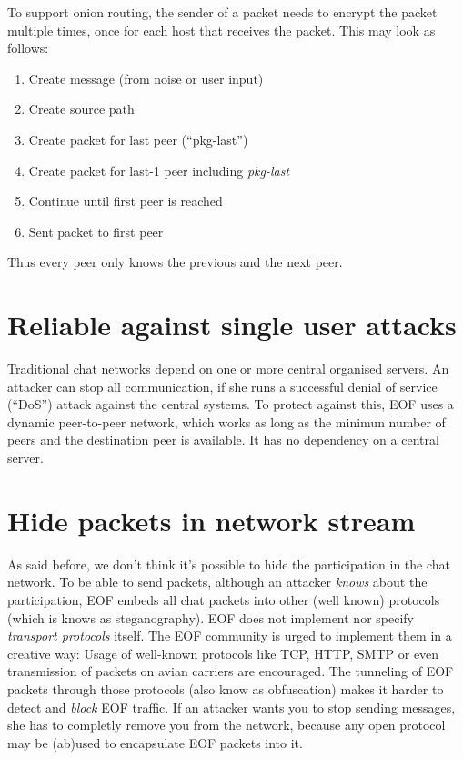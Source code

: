To support onion routing, the sender of a packet needs to encrypt the packet
multiple times, once for each host that receives the packet. This may look
as follows:
\begin{enumerate}
\item Create message (from noise or user input)
\item Create source path
\item Create packet for last peer ("`pkg-last"')
\item Create packet for last-1 peer including \emph{pkg-last}
\item Continue until first peer is reached
\item Sent packet to first peer
\end{enumerate}
Thus every peer only knows the previous and the next peer.
\section{Reliable against single user attacks}
Traditional chat networks depend on one or more central organised servers.
An attacker can stop all communication, if she runs a successful denial
of service ("`DoS"') attack against the central systems.
To protect against this, EOF uses a dynamic peer-to-peer network, which works
as long as the minimun number of peers and the destination peer is available.
It has no dependency on a central server.
\section{Hide packets in network stream}
As said before, we don't think it's possible to hide the participation in the
chat network. To be able to send packets, although an attacker \emph{knows}
about the participation, EOF embeds all chat packets into other (well known)
protocols (which is knows as steganography\cite{stegano-1}).
EOF does not implement nor specify \emph{transport protocols} itself.
The EOF community is urged to implement them in a creative way: Usage
of well-known protocols like TCP\cite{tcp-1}, HTTP\cite{http-1},
SMTP\cite{smtp-1} or even transmission of packets on avian
carriers\cite{avian-1} are encouraged. The tunneling of EOF packets through
those protocols (also know as obfuscation) makes it harder to detect
and \emph{block} EOF traffic.
If an attacker wants you to stop sending messages, she has to completly
remove you from the network, because any open protocol may be (ab)used to
encapsulate EOF packets into it.
